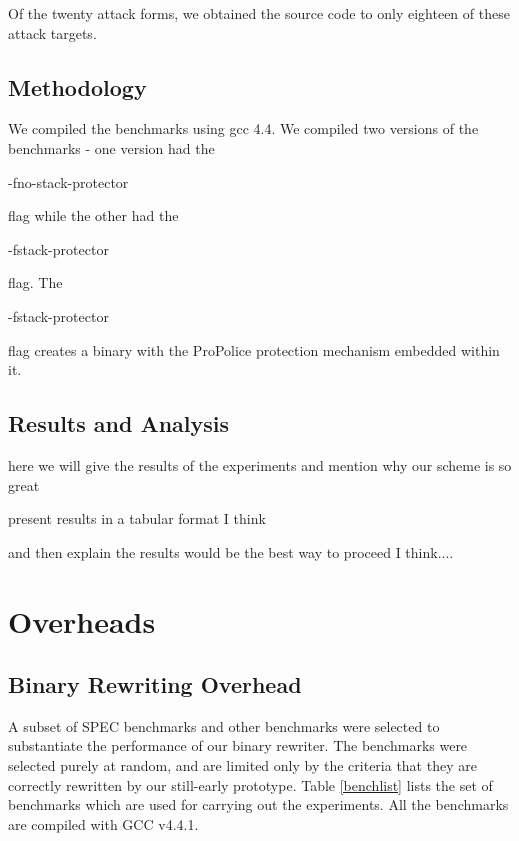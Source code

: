 Of the twenty attack forms, we obtained the source code to only eighteen of these attack targets.

\subsection{Methodology}

We compiled the benchmarks using gcc 4.4. We compiled two versions of the benchmarks - one version
had the \begin{em}-fno-stack-protector\end{em} flag while the other had the
\begin{em}-fstack-protector\end{em} flag. The \begin{em}-fstack-protector\end{em} flag creates a
binary with the ProPolice protection mechanism embedded within it.

\subsection{Results and Analysis}

here we will give the results of the experiments and mention why our scheme is so great

present results in a tabular format I think 

and then explain the results would be the best way to proceed I think....

\section{Overheads}

\subsection{Binary Rewriting Overhead}

A subset of SPEC benchmarks and other benchmarks were selected to substantiate the performance of
our binary rewriter. The benchmarks were selected purely at random, and are limited only by the
criteria that they are correctly rewritten by our still-early prototype. Table \ref{benchlist} lists
the set of benchmarks which are used for carrying out the experiments. All the benchmarks are
compiled with GCC v4.4.1.

